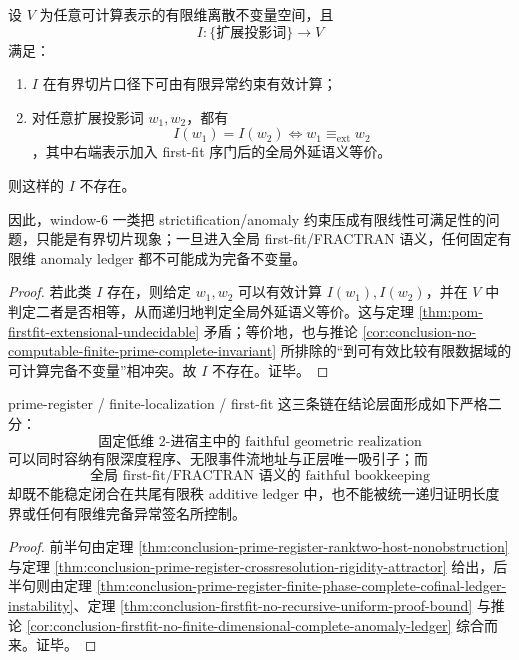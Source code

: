 \begin{corollary}\label{cor:conclusion-firstfit-no-finite-dimensional-complete-anomaly-ledger}
设 \(V\) 为任意可计算表示的有限维离散不变量空间，且
\[
I:\{\text{扩展投影词}\}\to V
\]
满足：
\begin{enumerate}
\normalfont
  \item \(I\) 在有界切片口径下可由有限异常约束有效计算；
  \item 对任意扩展投影词 \(w_1,w_2\)，都有
  \[
  I(w_1)=I(w_2)
  \iff
  w_1\equiv_{\mathrm{ext}} w_2
  \]
  ，其中右端表示加入 first-fit 序门后的全局外延语义等价。
\end{enumerate}
则这样的 \(I\) 不存在。

因此，window-\(6\) 一类把 strictification/anomaly 约束压成有限线性可满足性的问题，只能是有界切片现象；一旦进入全局 first-fit/FRACTRAN 语义，任何固定有限维 anomaly ledger 都不可能成为完备不变量。
\end{corollary}
\begin{proof}
若此类 \(I\) 存在，则给定 \(w_1,w_2\) 可以有效计算 \(I(w_1),I(w_2)\)，并在 \(V\) 中判定二者是否相等，从而递归地判定全局外延语义等价。这与定理 \ref{thm:pom-firstfit-extensional-undecidable} 矛盾；等价地，也与推论 \ref{cor:conclusion-no-computable-finite-prime-complete-invariant} 所排除的“到可有效比较有限数据域的可计算完备不变量”相冲突。故 \(I\) 不存在。证毕。
\end{proof}

\begin{corollary}\label{cor:conclusion-prime-register-ambient-vs-semantic-ledger-fracture}
prime-register / finite-localization / first-fit 这三条链在结论层面形成如下严格二分：
\[
\boxed{
\text{固定低维 }2\text{-进宿主中的 faithful geometric realization}
}
\]
可以同时容纳有限深度程序、无限事件流地址与正层唯一吸引子；而
\[
\boxed{
\text{全局 first-fit/FRACTRAN 语义的 faithful bookkeeping}
}
\]
却既不能稳定闭合在共尾有限秩 additive ledger 中，也不能被统一递归证明长度界或任何有限维完备异常签名所控制。
\end{corollary}
\begin{proof}
前半句由定理 \ref{thm:conclusion-prime-register-ranktwo-host-nonobstruction} 与定理 \ref{thm:conclusion-prime-register-crossresolution-rigidity-attractor} 给出，后半句则由定理 \ref{thm:conclusion-prime-register-finite-phase-complete-cofinal-ledger-instability}、定理 \ref{thm:conclusion-firstfit-no-recursive-uniform-proof-bound} 与推论 \ref{cor:conclusion-firstfit-no-finite-dimensional-complete-anomaly-ledger} 综合而来。证毕。
\end{proof}

\endinput
